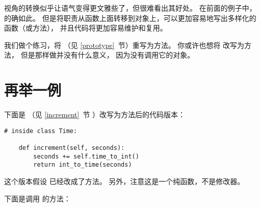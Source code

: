
视角的转换似乎让语气变得更文雅些了，但很难看出其好处。  
在前面的例子中，的确如此。  
但是将职责从函数上面转移到对象上，可以更加容易地写出多样化的函数（或方法）， 
并且代码将更加容易维护和复用。


我们做个练习，将  （见 \ref{prototype}~节）重写为方法。  
你或许也想将  改写为方法， 但是那样做并没有什么意义， 因为没有调用它的对象。

\section{再举一例}


下面是  （见 \ref{increment}~节 ）改写为方法后的代码版本：

\begin{lstlisting}
# inside class Time:

    def increment(self, seconds):
        seconds += self.time_to_int()
        return int_to_time(seconds)
\end{lstlisting}

%

这个版本假设  已经改成了方法。  另外，注意这是一个纯函数，不是修改器。


下面是调用  的方法：

